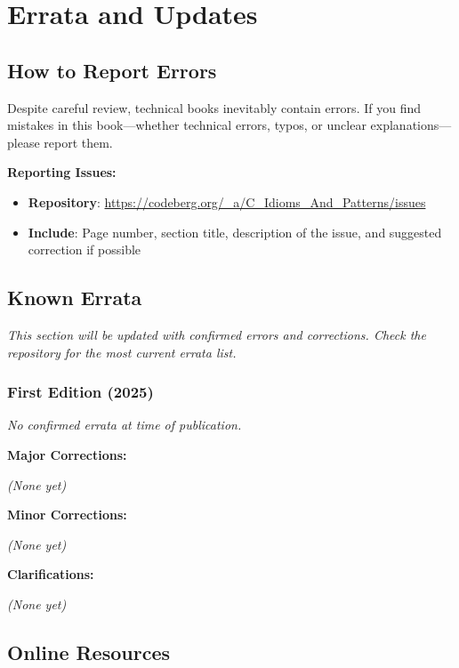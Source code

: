 \documentclass[11pt,openany]{book}
\begin{document}
\chapter{Errata and Updates}

\section*{How to Report Errors}

Despite careful review, technical books inevitably contain errors. If you find mistakes in this book—whether technical errors, typos, or unclear explanations—please report them.

\textbf{Reporting Issues:}

\begin{itemize}
    \item \textbf{Repository}: \url{https://codeberg.org/_a/C_Idioms_And_Patterns/issues}
    \item \textbf{Include}: Page number, section title, description of the issue, and suggested correction if possible
\end{itemize}

\section*{Known Errata}

\textit{This section will be updated with confirmed errors and corrections. Check the repository for the most current errata list.}

\subsection*{First Edition (2025)}

\textit{No confirmed errata at time of publication.}

\vspace{1em}

\textbf{Major Corrections:}

\textit{(None yet)}

\vspace{1em}

\textbf{Minor Corrections:}

\textit{(None yet)}

\vspace{1em}

\textbf{Clarifications:}

\textit{(None yet)}

\section*{Online Resources}
\end{document}
